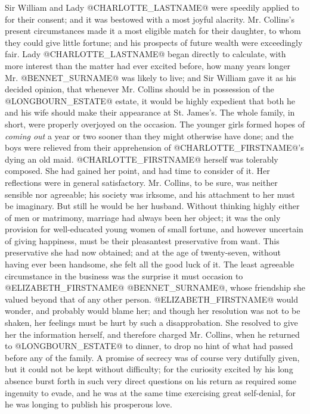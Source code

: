 Sir William and Lady @CHARLOTTE_LASTNAME@ were speedily applied to for their consent;
and it was bestowed with a most joyful alacrity. Mr. Collins's present
circumstances made it a most eligible match for their daughter, to whom
they could give little fortune; and his prospects of future wealth were
exceedingly fair. Lady @CHARLOTTE_LASTNAME@ began directly to calculate, with more
interest than the matter had ever excited before, how many years longer
Mr. @BENNET_SURNAME@ was likely to live; and Sir William gave it as his decided
opinion, that whenever Mr. Collins should be in possession of the
@LONGBOURN_ESTATE@ estate, it would be highly expedient that both he and his wife
should make their appearance at St. James's. The whole family, in short,
were properly overjoyed on the occasion. The younger girls formed hopes
of \textit{coming out} a year or two sooner than they might otherwise have
done; and the boys were relieved from their apprehension of @CHARLOTTE_FIRSTNAME@'s
dying an old maid. @CHARLOTTE_FIRSTNAME@ herself was tolerably composed. She had
gained her point, and had time to consider of it. Her reflections were
in general satisfactory. Mr. Collins, to be sure, was neither sensible
nor agreeable; his society was irksome, and his attachment to her must
be imaginary. But still he would be her husband. Without thinking highly
either of men or matrimony, marriage had always been her object; it was
the only provision for well-educated young women of small fortune,
and however uncertain of giving happiness, must be their pleasantest
preservative from want. This preservative she had now obtained; and at
the age of twenty-seven, without having ever been handsome, she felt all
the good luck of it. The least agreeable circumstance in the business
was the surprise it must occasion to @ELIZABETH_FIRSTNAME@ @BENNET_SURNAME@, whose friendship
she valued beyond that of any other person. @ELIZABETH_FIRSTNAME@ would wonder,
and probably would blame her; and though her resolution was not to be
shaken, her feelings must be hurt by such a disapprobation. She resolved
to give her the information herself, and therefore charged Mr. Collins,
when he returned to @LONGBOURN_ESTATE@ to dinner, to drop no hint of what had
passed before any of the family. A promise of secrecy was of course very
dutifully given, but it could not be kept without difficulty; for the
curiosity excited by his long absence burst forth in such very direct
questions on his return as required some ingenuity to evade, and he was
at the same time exercising great self-denial, for he was longing to
publish his prosperous love.

